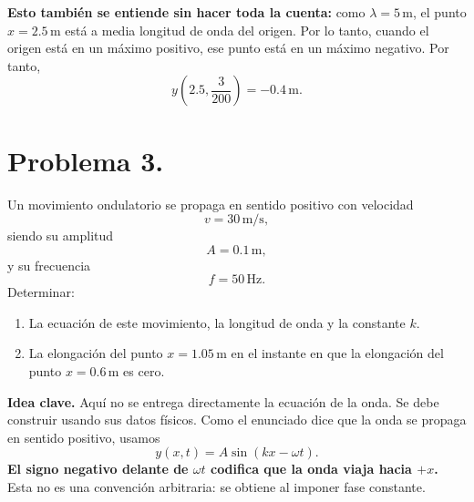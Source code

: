 \documentclass[11pt]{article}
\newcommand{\ideaclave}[1]{%
  \par\medskip
  \noindent\textbf{Idea clave.} #1\par
}
\begin{document}
\textbf{Esto tambi\'en se entiende sin hacer toda la cuenta:} como $\lambda=5\,\mathrm{m}$, el punto $x=2.5\,\mathrm{m}$ est\'a a media longitud de onda del origen. Por lo tanto, cuando el origen est\'a en un m\'aximo positivo, ese punto est\'a en un m\'aximo negativo. Por tanto,
\begin{equation*}
    \boxed{y\left(2.5,\frac{3}{200}\right)=-0.4\,\mathrm{m}}.
\end{equation*}

\clearpage

\section*{Problema 3.}
Un movimiento ondulatorio se propaga en sentido positivo con velocidad
\begin{equation*}
    v=30\,\mathrm{m/s},
\end{equation*}
siendo su amplitud
\begin{equation*}
    A=0.1\,\mathrm{m},
\end{equation*}
y su frecuencia
\begin{equation*}
    f=50\,\mathrm{Hz}.
\end{equation*}
Determinar:
\begin{enumerate}[label=(\alph*)]
    \item La ecuaci\'on de este movimiento, la longitud de onda y la constante $k$.
    \item La elongaci\'on del punto $x=1.05\,\mathrm{m}$ en el instante en que la elongaci\'on del punto $x=0.6\,\mathrm{m}$ es cero.
\end{enumerate}

\ideaclave{Aqu\'i no se entrega directamente la ecuaci\'on de la onda. Se debe construir usando sus datos f\'isicos. Como el enunciado dice que la onda se propaga en sentido positivo, usamos
\begin{equation*}
    y(x,t)=A\sin(kx-\omega t).
\end{equation*}
\textbf{El signo negativo delante de $\omega t$ codifica que la onda viaja hacia $+x$.} Esta no es una convenci\'on arbitraria: se obtiene al imponer fase constante.}
\end{document}
